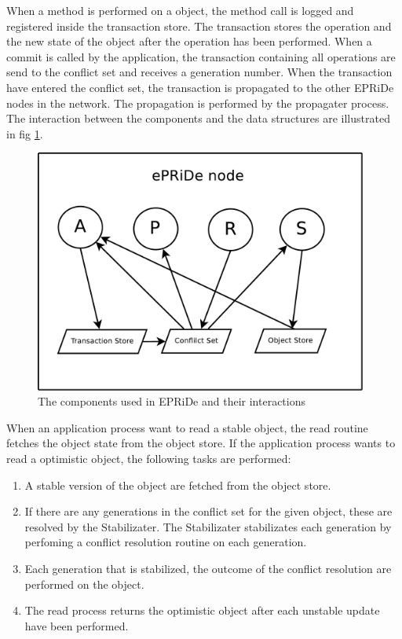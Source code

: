 When a method is performed on a object, the method call is logged and registered inside the transaction store. The transaction stores the operation and the new state of the object after the operation has been performed. When a commit is called by the application, the transaction containing all operations are send to the conflict set and receives a generation number. When the transaction have entered the conflict set, the transaction is propagated to the other EPRiDe nodes in the network. The propagation is performed by the propagater process. The interaction between the components and the data structures are illustrated in fig \ref{fig:components}.
\begin{figure}[htb]
\centerline{\includegraphics[height=8cm]{components.pdf}}
\caption{The components used in EPRiDe and their interactions}\label{fig:components}
\end{figure}

When an application process want to read a stable object, the read routine fetches the object state from the object store. If the application process wants to read a optimistic object, the following tasks are performed: 
\begin{enumerate}
	\item A stable version of the object are fetched from the object store.
	\item If there are any generations in the conflict set for the given object, these are resolved by the Stabilizater. The Stabilizater stabilizates each generation by perfoming a conflict resolution routine on each generation. 
	\item Each generation that is stabilized, the outcome of the conflict resolution are performed on the object. 
	\item The read process returns the optimistic object after each unstable update have been performed.
\end{enumerate}


